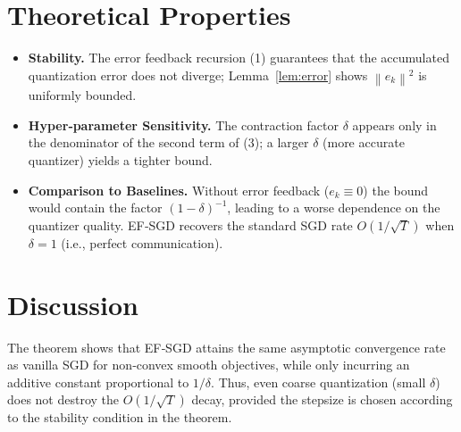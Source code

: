 \documentclass{article}
\newcommand{\norm}[1]{\left\|#1\right\|}
\begin{document}
\section*{Theoretical Properties}
\begin{itemize}[leftmargin=*]
\item \textbf{Stability.} The error feedback recursion (1) guarantees that
the accumulated quantization error does not diverge; Lemma~\ref{lem:error}
shows $\norm{e_k}^2$ is uniformly bounded.
\item \textbf{Hyper‑parameter Sensitivity.}
The contraction factor $\delta$ appears only in the denominator of the
second term of (3); a larger $\delta$ (more accurate quantizer) yields
a tighter bound.
\item \textbf{Comparison to Baselines.}
Without error feedback ($e_k\equiv0$) the bound would contain the factor
$(1-\delta)^{-1}$, leading to a worse dependence on the quantizer quality.
EF‑SGD recovers the standard SGD rate $O(1/\sqrt{T})$ when $\delta=1$
(i.e., perfect communication).
\end{itemize}

\section*{Discussion}
The theorem shows that EF‑SGD attains the same asymptotic
convergence rate as vanilla SGD for non‑convex smooth objectives,
while only incurring an additive constant proportional to $1/\delta$.
Thus, even coarse quantization (small $\delta$) does not destroy the
$O(1/\sqrt{T})$ decay, provided the stepsize is chosen according to the
stability condition in the theorem.

\newpage
\end{document}
